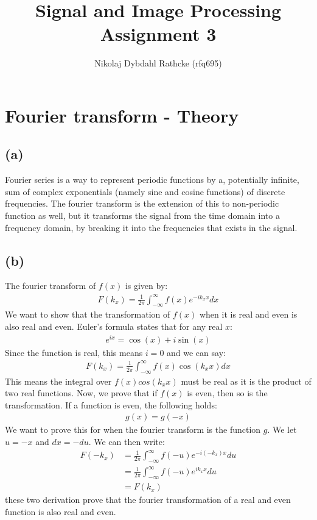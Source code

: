\documentclass[a4paper]{article}
\author{Nikolaj Dybdahl Rathcke (rfq695)}
\title{Signal and Image Processing \\ Assignment 3}
\begin{document}
\maketitle

\section{Fourier transform - Theory}
\subsection{(a)}
Fourier series is a way to represent periodic functions by a, potentially infinite, sum of complex exponentials (namely sine and cosine functions) of discrete frequencies. The fourier transform is the extension of this to non-periodic function as well, but it transforms the signal from the time domain into a frequency domain, by breaking it into the frequencies that exists in the signal.

\subsection{(b)}
The fourier transform of $f(x)$ is given by:
\begin{align*}
  F(k_x)=\frac{1}{2\pi}\int_{-\infty}^{\infty}f(x)e^{-ik_xx}dx
\end{align*}
We want to show that the transformation of $f(x)$ when it is real and even is also real and even. Euler's formula states that for any real $x$:
\begin{align*}
  e^{ix}=\cos(x)+i\sin(x)
\end{align*}
Since the function is real, this means $i=0$ and we can say:
\begin{align*}
  F(k_x)=\frac{1}{2\pi}\int_{-\infty}^{\infty}f(x)\cos(k_xx)dx
\end{align*}
This means the integral over $f(x)cos(k_xx)$ must be real as it is the product of two real functions. Now, we prove that if $f(x)$ is even, then so is the transformation. If a function is even, the following holds:
\begin{align*}
  g(x)=g(-x)
\end{align*}
We want to prove this for when the fourier transform is the function $g$. We let $u=-x$ and $dx=-du$. We can then write:
\begin{align*}
  F(-k_x)&= \frac{1}{2\pi}\int_{-\infty}^{\infty}f(-u)e^{-i(-k_x)x}du \\
         &= \frac{1}{2\pi}\int_{-\infty}^{\infty}f(-u)e^{ik_xx}du \\
  &= F(k_x)
\end{align*}
these two derivation prove that the fourier transformation of a real and even function is also real and even.
\end{document}
